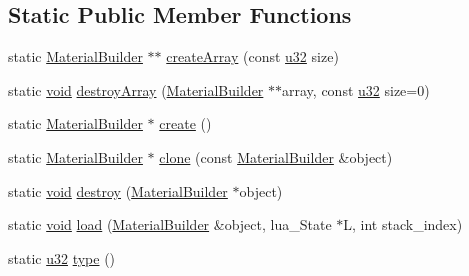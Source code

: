 \subsection*{Static Public Member Functions}
\begin{DoxyCompactItemize}
\item 
static \mbox{\hyperlink{classnjli_1_1_material_builder}{Material\+Builder}} $\ast$$\ast$ \mbox{\hyperlink{classnjli_1_1_material_builder_a7b155539c03fe505fb82942c982ccc72}{create\+Array}} (const \mbox{\hyperlink{_util_8h_a10e94b422ef0c20dcdec20d31a1f5049}{u32}} size)
\item 
static \mbox{\hyperlink{_thread_8h_af1e856da2e658414cb2456cb6f7ebc66}{void}} \mbox{\hyperlink{classnjli_1_1_material_builder_ae9f327274245a38631fbe03c44479583}{destroy\+Array}} (\mbox{\hyperlink{classnjli_1_1_material_builder}{Material\+Builder}} $\ast$$\ast$array, const \mbox{\hyperlink{_util_8h_a10e94b422ef0c20dcdec20d31a1f5049}{u32}} size=0)
\item 
static \mbox{\hyperlink{classnjli_1_1_material_builder}{Material\+Builder}} $\ast$ \mbox{\hyperlink{classnjli_1_1_material_builder_a03cf7866e76691ce27d44fde730bf59a}{create}} ()
\item 
static \mbox{\hyperlink{classnjli_1_1_material_builder}{Material\+Builder}} $\ast$ \mbox{\hyperlink{classnjli_1_1_material_builder_a2748f334d7e74cfd8b17e404822379b1}{clone}} (const \mbox{\hyperlink{classnjli_1_1_material_builder}{Material\+Builder}} \&object)
\item 
static \mbox{\hyperlink{_thread_8h_af1e856da2e658414cb2456cb6f7ebc66}{void}} \mbox{\hyperlink{classnjli_1_1_material_builder_a2d4800c922242a8e931c98b5792b8d97}{destroy}} (\mbox{\hyperlink{classnjli_1_1_material_builder}{Material\+Builder}} $\ast$object)
\item 
static \mbox{\hyperlink{_thread_8h_af1e856da2e658414cb2456cb6f7ebc66}{void}} \mbox{\hyperlink{classnjli_1_1_material_builder_a75f20dba44c65bd88f34e4eb2b8d39c7}{load}} (\mbox{\hyperlink{classnjli_1_1_material_builder}{Material\+Builder}} \&object, lua\+\_\+\+State $\ast$L, int stack\+\_\+index)
\item 
static \mbox{\hyperlink{_util_8h_a10e94b422ef0c20dcdec20d31a1f5049}{u32}} \mbox{\hyperlink{classnjli_1_1_material_builder_a9b4a5cabb705cd50ac7ec14844818edf}{type}} ()
\end{DoxyCompactItemize}

